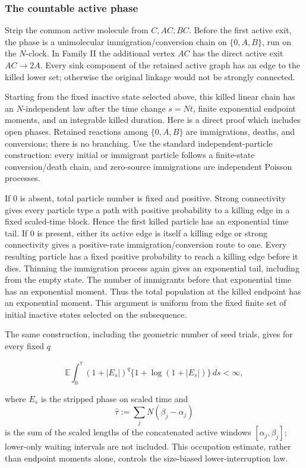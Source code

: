 \subsubsection{The countable active
phase}

Strip the common active molecule from \(C,AC,BC\). Before the first
active exit, the phase is a unimolecular immigration/conversion chain on
\(\{0,A,B\}\), run on the \(N\)-clock. In Family II the additional
vertex \(AC\) has the direct active exit \(AC\to2A\). Every sink
component of the retained active graph has an edge to the killed lower
set; otherwise the original linkage would not be strongly connected.

Starting from the fixed inactive state selected above, this killed
linear chain has an \(N\)-independent law after the time change
\(s=Nt\), finite exponential endpoint moments, and an integrable killed
duration. Here is a direct proof which includes open phases. Retained
reactions among \(\{0,A,B\}\) are immigrations, deaths, and conversions;
there is no branching. Use the standard independent-particle
construction: every initial or immigrant particle follows a finite-state
conversion/death chain, and zero-source immigrations are independent
Poisson processes.

If \(0\) is absent, total particle number is fixed and positive. Strong
connectivity gives every particle type a path with positive probability
to a killing edge in a fixed scaled-time block. Hence the first killed
particle has an exponential time tail. If \(0\) is present, either its
active edge is itself a killing edge or strong connectivity gives a
positive-rate immigration/conversion route to one. Every resulting
particle has a fixed positive probability to reach a killing edge before
it dies. Thinning the immigration process again gives an exponential
tail, including from the empty state. The number of immigrants before
that exponential time has an exponential moment. Thus the total
population at the killed endpoint has an exponential moment. This
argument is uniform from the fixed finite set of initial inactive states
selected on the subsequence.

The same construction, including the geometric number of seed trials,
gives for every fixed \(q\)

\[
 {\mathbb E}\int_0^{\widehat\tau}
 (1+|E_s|)^q\{1+\log(1+|E_s|)\}\,ds<\infty,            \tag{5.4a}
\]

where \(E_s\) is the stripped phase on scaled time and \[
 \widehat\tau:=\sum_jN(\beta_j-\alpha_j)
\] is the sum of the scaled lengths of the concatenated active windows
\([\alpha_j,\beta_j]\); lower-only waiting intervals are not included.
This occupation estimate, rather than endpoint moments alone, controls
the size-biased lower-interruption law.

